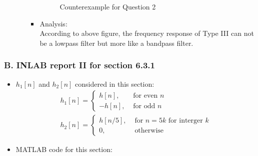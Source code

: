 \documentclass[onecolumn,oneside]{SUSTechHomework}
\begin{document}
\begin{itemize}
\begin{itemize}
\begin{itemize}
\begin{figure}[H]
            \caption{Counterexample for Question 2}
        \end{figure}
        \item Analysis:\\
         According to above figure, the frequency response of Type III can not be a lowpass filter but more like a bandpass filter.
        \end{itemize}
    \end{itemize}
\end{itemize}
\subsubsection*{B. INLAB report II for section 6.3.1}
\begin{itemize}
    \item $h_1[n]$ and $h_2[n]$ considered in this section:
    $$
    \begin{array}{c}h_{1}[n]=\left\{\begin{array}{lr}h[n], & \text { for even } n 
        \\-h[n], & \text { for odd } n\end{array}\right. 
        \\h_{2}[n]=\left\{\begin{array}{lr}h[n / 5], & \text { for } n=5 k \text { for interger } k 
            \\0, & \text { otherwise }\end{array}\right.
    \end{array}
    $$
    \item MATLAB code for this section:
\end{itemize}
\end{document}
